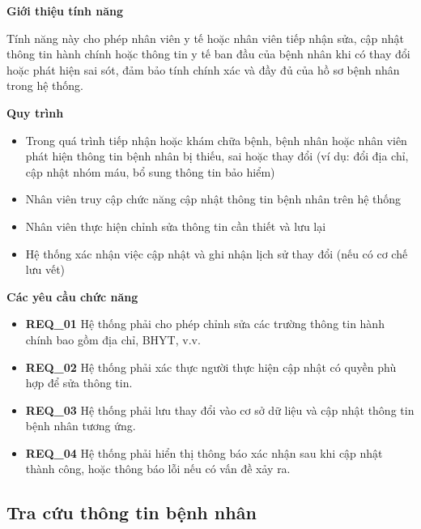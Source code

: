 \noindent \textbf{Giới thiệu tính năng}

Tính năng này cho phép nhân viên y tế hoặc nhân viên tiếp nhận sửa, cập nhật thông tin hành chính hoặc thông tin y tế ban đầu của bệnh nhân khi có thay đổi hoặc phát hiện sai sót, đảm bảo tính chính xác và đầy đủ của hồ sơ bệnh nhân trong hệ thống.

\noindent \textbf{Quy trình}

\begin{itemize}

\item Trong quá trình tiếp nhận hoặc khám chữa bệnh, bệnh nhân hoặc nhân viên phát hiện thông tin bệnh nhân bị thiếu, sai hoặc thay đổi (ví dụ: đổi địa chỉ, cập nhật nhóm máu, bổ sung thông tin bảo hiểm)

\item Nhân viên truy cập chức năng cập nhật thông tin bệnh nhân trên hệ thống

\item Nhân viên thực hiện chỉnh sửa thông tin cần thiết và lưu lại

\item Hệ thống xác nhận việc cập nhật và ghi nhận lịch sử thay đổi (nếu có cơ chế lưu vết)

\end{itemize}

\noindent \textbf{Các yêu cầu chức năng}

\begin{itemize}

\item \textbf{REQ\_01} Hệ thống phải cho phép chỉnh sửa các trường thông tin hành chính bao gồm địa chỉ, BHYT, v.v.

\item \textbf{REQ\_02} Hệ thống phải xác thực người thực hiện cập nhật có quyền phù hợp để sửa thông tin.

\item \textbf{REQ\_03} Hệ thống phải lưu thay đổi vào cơ sở dữ liệu và cập nhật thông tin bệnh nhân tương ứng.

\item \textbf{REQ\_04} Hệ thống phải hiển thị thông báo xác nhận sau khi cập nhật thành công, hoặc thông báo lỗi nếu có vấn đề xảy ra.

\end{itemize}

\subsection{Tra cứu thông tin bệnh nhân}

